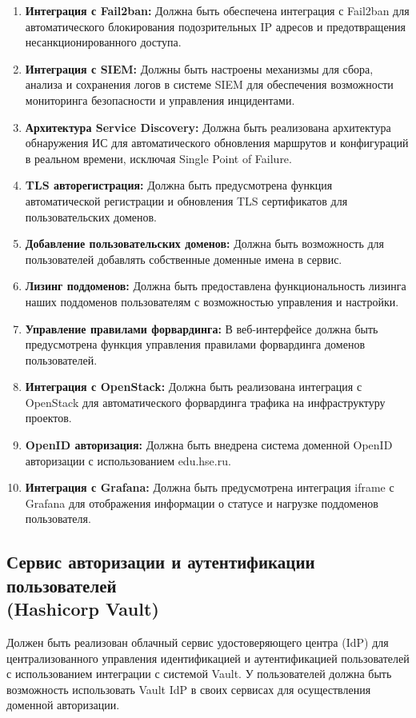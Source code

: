 \documentclass[14pt, a4paper]{extarticle}
\begin{document}
\begin{enumerate}
\item \textbf{Интеграция с Fail2ban:} Должна быть обеспечена интеграция с Fail2ban для автоматического блокирования подозрительных IP адресов и предотвращения несанкционированного доступа.
\item \textbf{Интеграция с SIEM:} Должны быть настроены механизмы для сбора, анализа и сохранения логов в системе SIEM для обеспечения возможности мониторинга безопасности и управления инцидентами.
\item \textbf{Архитектура Service Discovery:} Должна быть реализована архитектура обнаружения ИС для автоматического обновления маршрутов и конфигураций в реальном времени, исключая Single Point of Failure.
\item \textbf{TLS авторегистрация:} Должна быть предусмотрена функция автоматической регистрации и обновления TLS сертификатов для пользовательских доменов.
\item \textbf{Добавление пользовательских доменов:} Должна быть возможность для пользователей добавлять собственные доменные имена в сервис.
\item \textbf{Лизинг поддоменов:} Должна быть предоставлена функциональность лизинга наших поддоменов пользователям с возможностью управления и настройки.
\item \textbf{Управление правилами форвардинга:} В веб-интерфейсе должна быть предусмотрена функция управления правилами форвардинга доменов пользователей.
\item \textbf{Интеграция с OpenStack:} Должна быть реализована интеграция с OpenStack для автоматического форвардинга трафика на инфраструктуру проектов.
\item \textbf{OpenID авторизация:} Должна быть внедрена система доменной OpenID авторизации с использованием edu.hse.ru.
\item \textbf{Интеграция с Grafana:} Должна быть предусмотрена интеграция iframe с Grafana для отображения информации о статусе и нагрузке поддоменов пользователя.
\end{enumerate}


\subsection{Сервис авторизации и аутентификации пользователей\\ (Hashicorp Vault)}

Должен быть реализован облачный сервис удостоверяющего центра (IdP) для централизованного управления идентификацией и аутентификацией пользователей с использованием интеграции с системой Vault.
У пользователей должна быть возможность использовать Vault IdP в своих сервисах для осуществления доменной авторизации.
\end{document}
